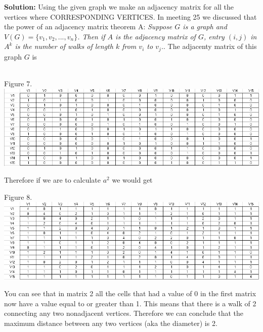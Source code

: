 \documentclass[10pt,a4paper]{report}
\begin{document}
		\noindent\textbf{Solution: }Using the given graph we make an adjacency matrix for all the vertices where CORRESPONDING VERTICES.  In meeting 25 we discussed that the power of an adjacency matrix theorem A: \emph{Suppose $G$ is a graph and $V(G) = \{v_{1}, v_{2}, ..., v_{n}\}$.  Then if $A$ is the adjacency matrix of $G$, entry $(i, j)$ in $A^{k}$ is the number of walks of length $k$ from $v_{i}$ to $v_{j}$.}.  The adjacenty matrix of this graph $G$ is  \\\\
		\begin{center}
			Figure 7.\\
			\includegraphics[scale=.64]{Math3310_Prob6.PNG} \\
		\end{center}
		
		\noindent Therefore if we are to calculate $a^{2}$ we would get\\
		
		\begin{center}
			Figure 8.\\
			\noindent\includegraphics[scale=.64]{Math3310_Prob6-1.PNG}\\
		\end{center}
		
		\noindent You can see that in matrix 2 all the cells that had a value of 0 in the first matrix now have a value equal to or greater than 1.  This means that there is a walk of 2 connecting any two nonadjacent vertices.  Therefore we can conclude that the maximum distance between any two vertices (aka the diameter) is 2.
		
\end{document}
